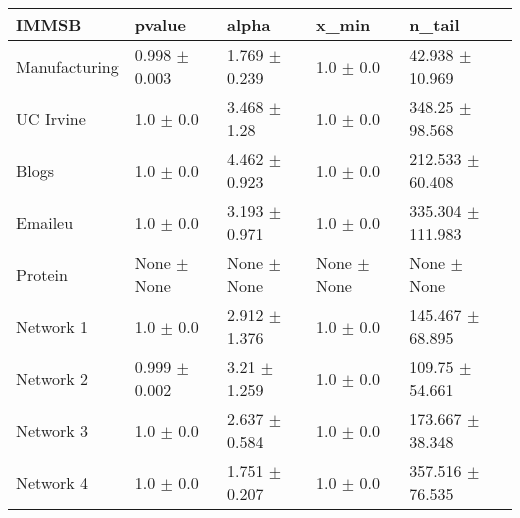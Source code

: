 \begin{tabular}{@{}lllll@{}}
\toprule

\textbf{IMMSB} & pvalue & alpha & x\_min & n\_tail \\\midrule

Manufacturing & 0.998 \(\pm\) 0.003 & 1.769 \(\pm\) 0.239 & 1.0 \(\pm\) 0.0 & 42.938 \(\pm\) 10.969 \\
UC Irvine & 1.0 \(\pm\) 0.0 & 3.468 \(\pm\) 1.28 & 1.0 \(\pm\) 0.0 & 348.25 \(\pm\) 98.568 \\
Blogs & 1.0 \(\pm\) 0.0 & 4.462 \(\pm\) 0.923 & 1.0 \(\pm\) 0.0 & 212.533 \(\pm\) 60.408 \\
Emaileu & 1.0 \(\pm\) 0.0 & 3.193 \(\pm\) 0.971 & 1.0 \(\pm\) 0.0 & 335.304 \(\pm\) 111.983 \\
Protein & None \(\pm\) None & None \(\pm\) None & None \(\pm\) None & None \(\pm\) None \\
Network 1 & 1.0 \(\pm\) 0.0 & 2.912 \(\pm\) 1.376 & 1.0 \(\pm\) 0.0 & 145.467 \(\pm\) 68.895 \\
Network 2 & 0.999 \(\pm\) 0.002 & 3.21 \(\pm\) 1.259 & 1.0 \(\pm\) 0.0 & 109.75 \(\pm\) 54.661 \\
Network 3 & 1.0 \(\pm\) 0.0 & 2.637 \(\pm\) 0.584 & 1.0 \(\pm\) 0.0 & 173.667 \(\pm\) 38.348 \\
Network 4 & 1.0 \(\pm\) 0.0 & 1.751 \(\pm\) 0.207 & 1.0 \(\pm\) 0.0 & 357.516 \(\pm\) 76.535 \\

\bottomrule
\end{tabular}
